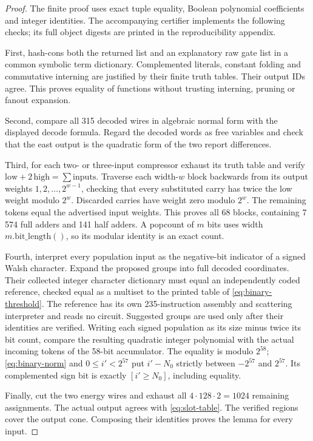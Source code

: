 \begin{proof}
The finite proof uses exact tuple equality, Boolean polynomial coefficients and integer identities. The accompanying certifier implements the following checks; its full object digests are printed in the reproducibility appendix.

First, hash-cons both the returned list and an explanatory raw gate list in a common symbolic term dictionary. Complemented literals, constant folding and commutative interning are justified by their finite truth tables. Their output IDs agree. This proves equality of functions without trusting interning, pruning or fanout expansion.

Second, compare all 315 decoded wires in algebraic normal form with the displayed decode formula. Regard the decoded words as free variables and check that the east output is the quadratic form of the two report differences.

Third, for each two- or three-input compressor exhaust its truth table and verify \(\mathrm{low}+2\,\mathrm{high}=\sum\mathrm{inputs}\). Traverse each width-\(w\) block backwards from its output weights \(1,2,\ldots,2^{w-1}\), checking that every substituted carry has twice the low weight modulo \(2^w\). Discarded carries have weight zero modulo \(2^w\). The remaining tokens equal the advertised input weights. This proves all 68 blocks, containing 7\,574 full adders and 141 half adders. A popcount of \(m\) bits uses width \(m.\mathrm{bit\_length}()\), so its modular identity is an exact count.

Fourth, interpret every population input as the negative-bit indicator of a signed Walsh character. Expand the proposed groups into full decoded coordinates. Their collected integer character dictionary must equal an independently coded reference, checked equal as a multiset to the printed table of \eqref{eq:binary-threshold}. The reference has its own 235-instruction assembly and scattering interpreter and reads no circuit. Suggested groups are used only after their identities are verified. Writing each signed population as its size minus twice its bit count, compare the resulting quadratic integer polynomial with the actual incoming tokens of the 58-bit accumulator. The equality is modulo \(2^{58}\); \eqref{eq:binary-norm} and \(0\le i'<2^{57}\) put \(i'-N_0\) strictly between \(-2^{57}\) and \(2^{57}\). Its complemented sign bit is exactly \([i'\ge N_0]\), including equality.

Finally, cut the two energy wires and exhaust all \(4\cdot128\cdot2=1024\) remaining assignments. The actual output agrees with \eqref{eq:slot-table}. The verified regions cover the output cone. Composing their identities proves the lemma for every input.
\end{proof}

